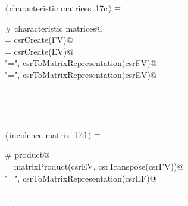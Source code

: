 \documentclass[11pt,oneside]{article}	%
\begin{document}
\begin{flushleft} \small
\begin{minipage}{\linewidth} \label{scrap34}
\protect{}$\langle\,$characteristic matrices\nobreak\ {\footnotesize 17c}$\,\rangle\equiv$
\vspace{-1ex}
\begin{list}{}{} \item
\mbox{}\verb@# characteristic matrices@\\
\mbox{}\verb@csrFV = csrCreate(FV)@\\
\mbox{}\verb@csrEV = csrCreate(EV)@\\
\mbox{}\verb@print "\nFV =\n", csrToMatrixRepresentation(csrFV)@\\
\mbox{}\verb@print "\nEV =\n", csrToMatrixRepresentation(csrEV)@\\
\mbox{}\verb@@{\NWsep}
\end{list}
\vspace{-1ex}
\footnotesize\addtolength{\baselineskip}{-1ex}
\begin{list}{}{\setlength{\itemsep}{-\parsep}\setlength{\itemindent}{-\leftmargin}}
\item \NWtxtMacroRefIn\ .
\end{list}
\end{minipage}\\[4ex]
\end{flushleft}

\begin{flushleft} \small
\begin{minipage}{\linewidth} \label{scrap35}
\protect{}$\langle\,$incidence matrix\nobreak\ {\footnotesize 17d}$\,\rangle\equiv$
\vspace{-1ex}
\begin{list}{}{} \item
\mbox{}\verb@# product@\\
\mbox{}\verb@csrEF = matrixProduct(csrEV, csrTranspose(csrFV))@\\
\mbox{}\verb@print "\nEF =\n", csrToMatrixRepresentation(csrEF)@\\
\mbox{}\verb@@{\NWsep}
\end{list}
\vspace{-1ex}
\footnotesize\addtolength{\baselineskip}{-1ex}
\begin{list}{}{\setlength{\itemsep}{-\parsep}\setlength{\itemindent}{-\leftmargin}}
\item \NWtxtMacroRefIn\ .
\end{list}
\end{minipage}\\[4ex]
\end{flushleft}
\end{document}
